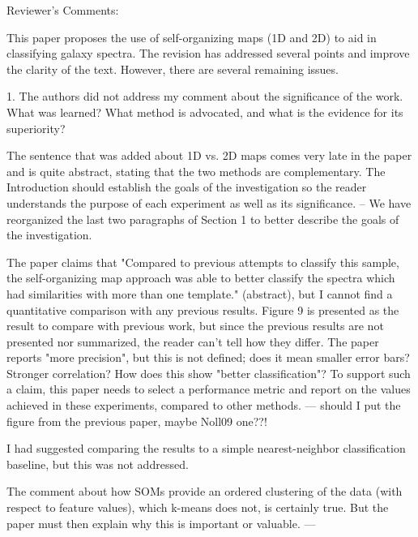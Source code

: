 Reviewer's Comments:

This paper proposes the use of self-organizing maps (1D and 2D) to aid in classifying galaxy spectra.  The revision has addressed several points and improve the clarity of the text.  However, there are several remaining issues.

1. The authors did not address my comment about the significance of the work.  What was learned?  What method is advocated, and what is the evidence for its superiority?

The sentence that was added about 1D vs. 2D maps comes very late in the paper and is quite abstract, stating that the two methods are complementary.  The Introduction should establish the goals of the investigation so the reader understands the purpose of each experiment as well as its significance.
-- We have reorganized the last two paragraphs of Section 1 to better describe the goals of the investigation.


The paper claims that "Compared to previous attempts to classify this sample, the self-organizing map approach was able to better classify the spectra which had similarities with more than one template." (abstract), but I cannot find a quantitative comparison with any previous results.  Figure 9 is presented as the result to compare with previous work, but since the previous results are not presented nor summarized, the reader can't tell how they differ.  The paper reports "more precision", but this is not defined; does it mean smaller error bars?  Stronger correlation?  How does this show "better classification"?  To support such a claim, this paper needs to select a performance metric and report on the values achieved in these experiments, compared to other methods.
--- should I put the figure from the previous paper, maybe Noll09 one??! 

I had suggested comparing the results to a simple nearest-neighbor classification baseline, but this was not addressed.

The comment about how SOMs provide an ordered clustering of the data (with respect to feature values), which k-means does not, is certainly true.  But the paper must then explain why this is important or valuable.
--- %

